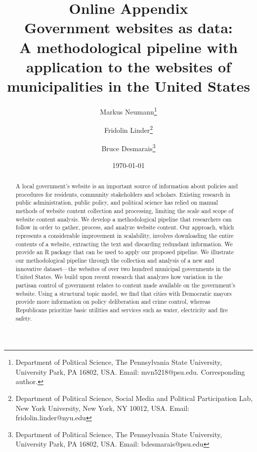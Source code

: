 \documentclass[11pt]{article}
\title{\vspace{-2cm} {\bf Online Appendix} \\ Government websites as data: \\ A methodological pipeline with application to the websites of municipalities in the United States}
\author{ Markus Neumann\footnote{Department of Political Science, The Pennsylvania State University, University Park, PA 16802, USA. Email: mvn5218@psu.edu. Corresponding author.} \and Fridolin Linder\footnote{Department of Political Science, Social Media and Political Participation Lab, New York University, New York, NY 10012, USA. Email: fridolin.linder@nyu.edu} \and Bruce Desmarais\footnote{Department of Political Science, The Pennsylvania State University, University Park, PA 16802, USA. Email: bdesmarais@psu.edu}} \date{\today}
\begin{document}
\maketitle




\begin{abstract}

A local government's website is an important source of information about policies and procedures for residents, community stakeholders and scholars. Existing research in public administration, public policy, and political science has relied on manual methods of website content collection and processing, limiting the scale and scope of website content analysis. We develop a methodological pipeline that researchers can follow in order to gather, process, and analyze website content. Our approach, which represents a considerable improvement in scalability, involves downloading the entire contents of a website, extracting the text and discarding redundant information. We provide an R package that can be used to apply our proposed pipeline. We illustrate our methodological pipeline through the collection and analysis of a new and innovative dataset---the websites of over two hundred municipal governments in the United States. We build upon recent research that analyzes how variation in the partisan control of government relates to content made available on the government's website. Using a structural topic model, we find that cities with Democratic mayors provide more information on policy deliberation and crime control, whereas Republicans prioritize basic utilities and services such as water, electricity and fire safety.

\end{abstract}
\thispagestyle{empty}
\doublespacing
\end{document}
